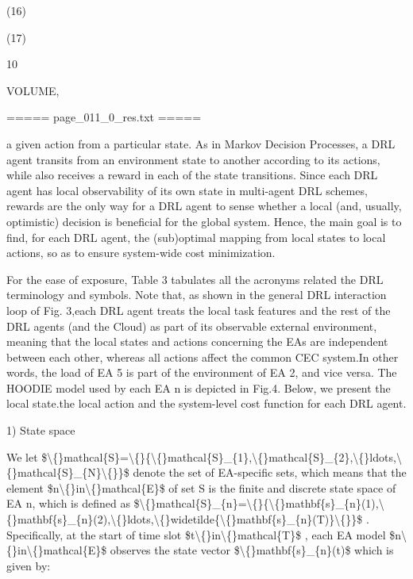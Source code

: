 \documentclass{article}
\begin{document}
(16)

(17)

10

VOLUME,

===== page\_011\_0\_res.txt =====


a given action from a particular state. As in Markov Decision Processes, a DRL agent transits from an environment state to another according to its actions, while also receives a reward in each of the state transitions. Since each DRL agent has local observability of its own state in multi-agent DRL schemes, rewards are the only way for a DRL agent to sense whether a local (and, usually, optimistic) decision is beneficial for the global system. Hence, the main goal is to find, for each DRL agent, the (sub)optimal mapping from local states to local actions, so as to ensure system-wide cost minimization.

For the ease of exposure, Table 3 tabulates all the acronyms related the DRL terminology and symbols. Note that, as shown in the general DRL interaction loop of Fig. 3,each DRL agent treats the local task features and the rest of the DRL agents (and the Cloud) as part of its observable external environment, meaning that the local states and actions concerning the EAs are independent between each other, whereas all actions affect the common CEC system.In other words, the load of EA 5 is part of the environment of EA 2, and vice versa. The HOODIE model used by each EA n is depicted in Fig.4. Below, we present the local state.the local action and the system-level cost function for each DRL agent.

1) State space

We let \$\textbackslash\{\}mathcal\{S\}=\textbackslash\{\}\{\textbackslash\{\}mathcal\{S\}\_\{1\},\textbackslash\{\}mathcal\{S\}\_\{2\},\textbackslash\{\}ldots,\textbackslash\{\}mathcal\{S\}\_\{N\}\textbackslash\{\}\}\$ denote the set of EA-specific sets, which means that the element \$n\textbackslash\{\}in\textbackslash\{\}mathcal\{E\}\$ of set S is the finite and discrete state space of EA n, which is defined as \$\textbackslash\{\}mathcal\{S\}\_\{n\}=\textbackslash\{\}\{\textbackslash\{\}mathbf\{s\}\_\{n\}(1),\textbackslash\{\}mathbf\{s\}\_\{n\}(2),\textbackslash\{\}ldots,\textbackslash\{\}widetilde\{\textbackslash\{\}mathbf\{s\}\_\{n\}(T)\}\textbackslash\{\}\}\$ . Specifically, at the start of time  slot \$t\textbackslash\{\}in\textbackslash\{\}mathcal\{T\}\$ , each EA model \$n\textbackslash\{\}in\textbackslash\{\}mathcal\{E\}\$ observes the state vector \$\textbackslash\{\}mathbf\{s\}\_\{n\}(t)\$ which is given by:
\end{document}
